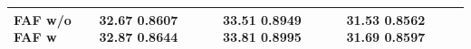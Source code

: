 \begin{tabular}{llll}
\toprule
FAF w/o FAF w & 32.67 0.8607 32.87 0.8644 & 33.51 0.8949 33.81 0.8995 & 31.53 0.8562 31.69 0.8597 \\
\midrule
\bottomrule
\end{tabular}
